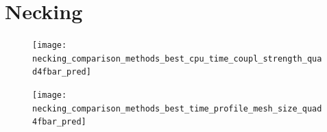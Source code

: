 \section{Necking}

\begin{figure}
\texttt{[image: necking\_comparison\_methods\_best\_cpu\_time\_coupl\_strength\_quad4fbar\_pred]}
\end{figure}

\begin{figure}
\texttt{[image: necking\_comparison\_methods\_best\_time\_profile\_mesh\_size\_quad4fbar\_pred]}
\end{figure}
